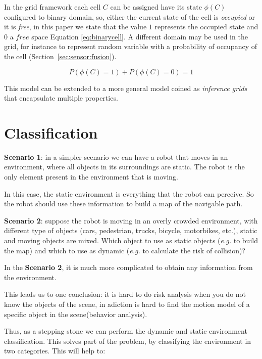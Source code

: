 In the grid framework each cell $C$ can be assigned have its state $\phi(C)$ configured to binary domain, so, either the current state of the cell is \textit{occupied} or it is \textit{free}, in this paper we state that the value $1$ represents the occupied state and $0$ a $free$ space Equation \ref{eq:binarycell}. A different domain may be used in the grid, for instance to represent random variable with a probability of occupancy of the cell (Section~\ref{sec:sensor:fusion}).

\begin{equation}
P(\phi(C)=1) + P(\phi(C)=0) = 1
\label{eq:binarycell}
\end{equation}

This model can be extended to a more general model coined as \textit{inference grids} that encapsulate multiple properties\cite{Elfes:1989:OGP:916528}.

\section{Classification}

\textbf{Scenario 1}: in a simpler scenario we can have a robot that moves in an environment, where all objects in its surroundings are static. The robot is the only element present in the environment that is moving.

In this case, the static environment is everything that the robot can perceive. So the robot should use these information to build a map of the navigable path.

\textbf{Scenario 2}: suppose the robot is moving in an overly crowded environment, with different type of objects (cars, pedestrian, trucks, bicycle, motorbikes, etc.), static and moving objects are mixed. Which object to use as static objects (\textit{e.g.} to build the map) and which to use as dynamic (\textit{e.g.} to calculate the risk of collision)? 

In the \textbf{Scenario 2}, it is much more complicated to obtain any information from the environment.

This leads us to one conclusion: it is hard to do risk analysis when you do not know the objects of the scene, in adiction is hard to find the motion model of a specific object in the scene(behavior analysis).

Thus, as a stepping stone we can perform the dynamic and static environment classification. This solves part of the problem, by classifying the environment in two categories. This will help to:


